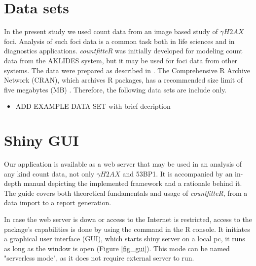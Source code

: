 \section{Data sets}
In the present study we used count data from an image based study of $\gamma H2AX$ foci. Analysis of such foci data is a common task both in life sciences and in diagnostics applications. \emph{countfitteR} was initially developed for modeling count data from the AKLIDES system, but it may be used for foci data from other systems.
The data were prepared as described in \citep{rodiger_quantification_2018}. The Comprehensive R Archive Network (CRAN), which archives R packages, has a recommended size limit of five megabytes (MB) \citep{anderson_hosting_2017}. Therefore, the following data sets are include only.

\begin{itemize}
 \item ADD EXAMPLE DATA SET with brief decription
\end{itemize}


\section{Shiny GUI} %

Our application is available as a web server that may be used in an analysis of any kind count data, not only $\gamma H2AX$ and 53BP1. It is accompanied by an in-depth manual depicting the implemented framework and a rationale behind it. The guide covers both theoretical fundamentals and usage of \emph{countfitteR}, from a data import to a report generation.

In case the web server is down or access to the Internet is restricted, access to the package’s capabilities is done by using the command in the R console. It initiates a graphical user interface (GUI), which starts shiny server on a local pc, it runs as long as the window is open (Figure \ref{fig_gui}). This mode can be named "serverless mode", as it does not require external server to run.

